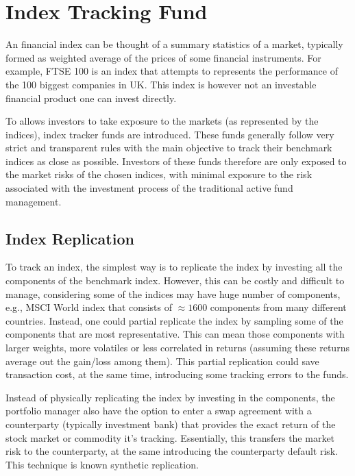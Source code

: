 \section{Index Tracking Fund}
An financial index can be thought of a summary statistics of a market, typically formed as weighted average of the prices of some financial instruments. For example, FTSE 100 is an index that attempts to represents the performance of the 100 biggest companies in UK. This index is however not an investable financial product one can invest directly.
 
To allows investors to take exposure to the markets (as represented by the indices), index tracker funds are introduced. These funds generally follow very strict and transparent rules with the main objective to track their benchmark indices as close as possible. Investors of these funds therefore are only exposed to the market risks of the chosen indices, with minimal exposure to the risk associated with the investment process of the traditional active fund management.
 
\subsection{Index Replication}
To track an index, the simplest way is to replicate the index by investing all the components of the benchmark index. However, this can be costly and difficult to manage, considering some of the indices may have huge number of components, e.g., MSCI World index that consists of $\approx 1600$ components from many different countries. Instead, one could partial replicate the index by sampling some of the components that are most representative. This can mean those components with larger weights, more volatiles or less correlated in returns (assuming these returns average out the gain/loss among them). This partial replication could save transaction cost, at the same time, introducing some tracking errors to the funds.
 
Instead of physically replicating the index by investing in the components, the portfolio manager also have the option to enter a swap agreement with a counterparty (typically investment bank) that provides the exact return of the stock market or commodity it’s tracking. Essentially, this transfers the market risk to the counterparty, at the same introducing the counterparty default risk. This technique is known synthetic replication.
 
